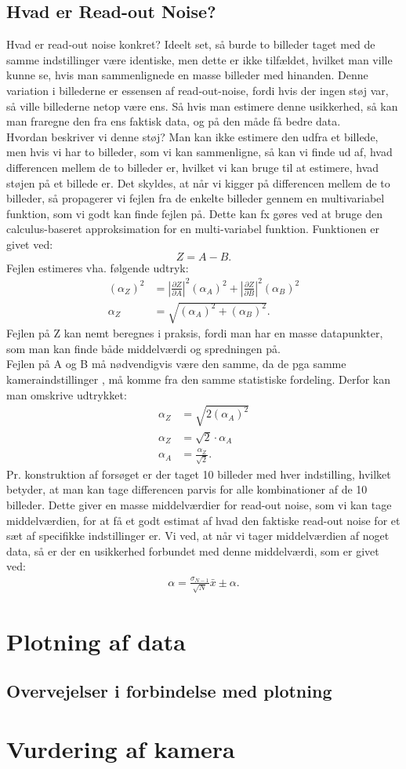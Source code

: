 \documentclass[working]{tuftebook}
\begin{document}
\subsection{Hvad er Read-out Noise?}
Hvad er read-out noise konkret? Ideelt set, så burde to billeder taget med de samme indstillinger være identiske, men dette er ikke tilfældet, hvilket man ville kunne se, hvis man sammenlignede en masse billeder med hinanden. Denne variation i billederne er essensen af read-out-noise, fordi hvis der ingen støj var, så ville billederne netop være ens. Så hvis man estimere denne usikkerhed, så kan man fraregne den fra ens faktisk data, og på den måde få bedre data. 
\\
Hvordan beskriver vi denne støj? Man kan ikke estimere den udfra et billede, men hvis vi har to billeder, som vi kan sammenligne, så kan vi finde ud af, hvad differencen mellem de to billeder er, hvilket vi kan bruge til at estimere, hvad støjen på et billede er. Det skyldes, at når vi kigger på differencen mellem de to billeder, så propagerer vi fejlen fra de enkelte billeder gennem en multivariabel funktion, som vi godt kan finde fejlen på. 
Dette kan fx gøres ved at bruge den calculus-baseret approksimation for en multi-variabel funktion. Funktionen er givet ved:
\[
Z = A - B
.\] 
Fejlen estimeres vha. følgende udtryk:
\begin{align*}
	(\alpha_Z)^2&=\left|   \frac{\partial Z}{\partial A}\right|^2(\alpha_A)^2+\left|   \frac{\partial Z}{\partial B}\right|^2(\alpha_B)^2 \\
	\alpha_Z&=\sqrt{(\alpha_A)^2+(\alpha_B)^2}
.\end{align*}
Fejlen på Z kan nemt beregnes i praksis, fordi man har en masse datapunkter, som man kan finde både middelværdi og spredningen på.
\\
Fejlen på A og B må nødvendigvis være den samme, da de pga samme kameraindstillinger , må komme fra den samme statistiske fordeling. Derfor kan man omskrive udtrykket:
\begin{align*}	
	\alpha_Z&=\sqrt{2(\alpha_A)^2} \\
	\alpha_Z&=\sqrt{2}\cdot \alpha_A \\
	\alpha_A&=\frac{\alpha_Z}{\sqrt{2}}
.\end{align*}
Pr. konstruktion af forsøget er der taget 10 billeder med hver indstilling, hvilket betyder, at man kan tage differencen parvis for alle kombinationer af de 10 billeder. Dette giver en masse middelværdier for read-out noise, som vi kan tage middelværdien, for at få et godt estimat af hvad den faktiske read-out noise for et sæt af specifikke indstillinger er. Vi ved, at når vi tager middelværdien af noget data, så er der en usikkerhed forbundet med denne middelværdi, som er givet ved:
\begin{align*}
\alpha = \frac{\sigma_{N-1}}{\sqrt{N}}
\bar{x}\pm \alpha
.\end{align*}
\section{Plotning af data}
\subsection{Overvejelser i forbindelse med plotning}
\section{Vurdering af kamera}
\end{document}
